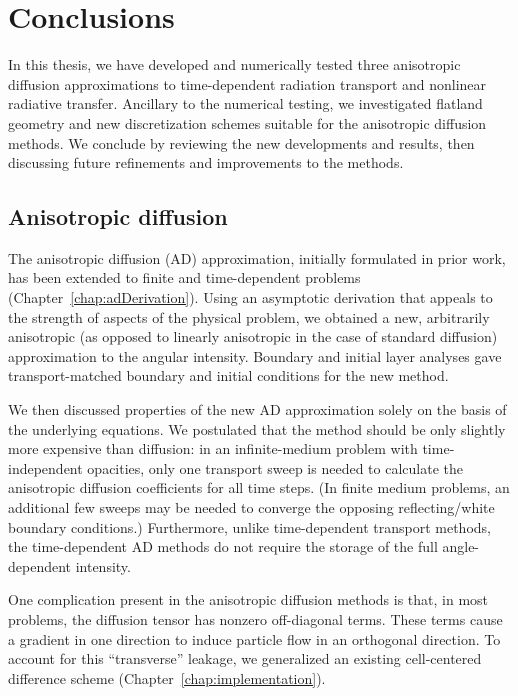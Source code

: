 
\chapter{Conclusions}\label{chap:conclusion}

In this thesis, we have developed and numerically tested three anisotropic
diffusion approximations to time-dependent radiation transport and
nonlinear radiative transfer. Ancillary to the numerical testing, we
investigated flatland geometry and new discretization schemes suitable for the
anisotropic diffusion methods. We conclude by reviewing the new developments and
results, then discussing future refinements and improvements to the methods.

\section{Anisotropic diffusion}

The anisotropic diffusion (AD) approximation, initially formulated in prior work, has been extended to finite and time-dependent problems
(Chapter~\ref{chap:adDerivation}). Using an asymptotic
derivation that appeals to the strength of aspects of the physical problem, we
obtained a new, arbitrarily anisotropic (as opposed to linearly anisotropic in
the case of standard diffusion) approximation to the angular intensity.
Boundary and initial layer analyses gave transport-matched boundary and initial
conditions for the new method.

We then discussed properties of the new AD approximation solely on the basis of
the underlying equations. We postulated that the method should be only slightly
more expensive than diffusion: in an infinite-medium problem with
time-independent opacities, only one transport sweep is needed to calculate
the anisotropic diffusion coefficients for all time steps. (In finite medium
problems, an additional few sweeps may be needed to converge the opposing
reflecting/white boundary conditions.) Furthermore, unlike time-dependent
transport methods, the time-dependent AD methods do not require the storage of
the full angle-dependent intensity.

One complication present in the anisotropic diffusion methods is
that, in most problems, the diffusion tensor has nonzero off-diagonal terms.
These terms cause a gradient in one direction to induce particle flow in an
orthogonal direction. To account for this ``transverse'' leakage, we generalized
an existing cell-centered difference scheme (Chapter~\ref{chap:implementation}).

